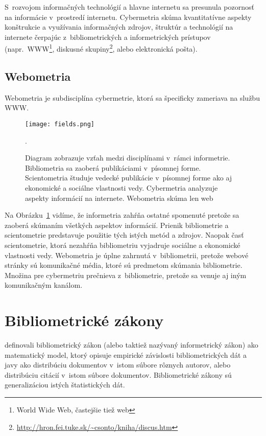 S~rozvojom informačných technológií a hlavne internetu sa presunula pozornosť na
informácie v~prostredí internetu.  Cybermetria skúma kvantitatívne aspekty
konštrukcie a využívania informačných zdrojov, štruktúr a technológií na
internete čerpajúc z~bibliometrických a informetrických prístupov
(napr.~WWW\footnote{World Wide Web, častejšie tiež web}, diskusné
skupiny\footnote{\url{http://hron.fei.tuke.sk/~csonto/kniha/discus.htm}}, alebo
elektronická pošta).


\subsection{Webometria}

Webometria je subdisciplína cybermetrie, ktorá sa špecificky zameriava na službu
WWW.

\begin{figure}
  \centering
  \texttt{[image: fields.png]}
  \caption[Vzťah medzi jednotlivými disciplínami v~rámci informetrie]%
  {Diagram zobrazuje vzťah medzi disciplínami v~rámci informetrie.  Bibliometria
    sa zaoberá publikáciami v~písomnej forme.  Scientometria študuje vedecké
    publikácie v~písomnej forme ako aj ekonomické a sociálne vlastnosti
    vedy.  Cybermetria analyzuje aspekty informácií na internete.  Webometria
    skúma len web \citep{Bjorneborn2004}}.
  \label{fig:fields}
\end{figure}

Na Obrázku~\ref{fig:fields} vidíme, že informetria zahŕňa ostatné spomenuté
 pretože sa zaoberá skúmaním všetkých aspektov informácií.  Prienik
bibliometrie a scientometrie predstavuje použitie tých istých metód a zdrojov.
Naopak časť scientometrie, ktorá nezahŕňa bibliometriu vyjadruje sociálne a
ekonomické vlastnosti vedy.  Webometria je úplne zahrnutá v~bibliometrii,
pretože webové stránky sú komunikačné média, ktoré sú predmetom skúmania
bibliometrie.  Množina pre cybermetriu prečnieva z~bibliometrie, pretože sa
venuje aj iným komunikačným kanálom.

\section{Bibliometrické zákony}

\citet{Todeschini2016} definovali bibliometrický zákon (alebo taktiež nazývaný
informetrický zákon) ako matematický model, ktorý opisuje empirické závislosti
bibliometrických dát a javy ako distribúciu dokumentov v~istom súbore rôznych
autorov, alebo distribúciu citácií v~istom súbore dokumentov.  Bibliometrické
zákony sú generalizáciou istých štatistických dát.

